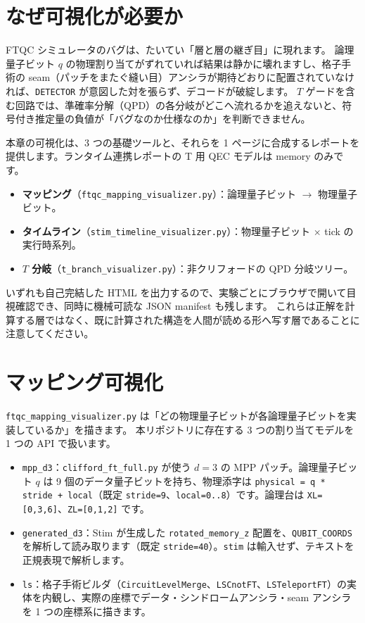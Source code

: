 \section{なぜ可視化が必要か}\label{sec:why_vis}

FTQC シミュレータのバグは、たいてい「層と層の継ぎ目」に現れます。
論理量子ビット $q$ の物理割り当てがずれていれば結果は静かに壊れますし、格子手術の seam（パッチをまたぐ縫い目）アンシラが期待どおりに配置されていなければ、\texttt{DETECTOR} が意図した対を張らず、デコードが破綻します。
$T$ ゲードを含む回路では、準確率分解（QPD）の各分岐がどこへ流れるかを追えないと、符号付き推定量の負値が「バグなのか仕様なのか」を判断できません。

本章の可視化は、3 つの基礎ツールと、それらを 1 ページに合成するレポートを提供します。ランタイム連携レポートの T 用 QEC モデルは memory のみです。

\begin{itemize}
  \item \textbf{マッピング}（\texttt{ftqc\_mapping\_visualizer.py}）：論理量子ビット $\to$ 物理量子ビット。
  \item \textbf{タイムライン}（\texttt{stim\_timeline\_visualizer.py}）：物理量子ビット $\times$ tick の実行時系列。
  \item \textbf{$T$ 分岐}（\texttt{t\_branch\_visualizer.py}）：非クリフォードの QPD 分岐ツリー。
\end{itemize}

いずれも自己完結した HTML を出力するので、実験ごとにブラウザで開いて目視確認でき、同時に機械可読な JSON manifest も残します。
これらは正解を計算する層ではなく、既に計算された構造を人間が読める形へ写す層であることに注意してください。

\section{マッピング可視化}\label{sec:mapping}

\texttt{ftqc\_mapping\_visualizer.py} は「どの物理量子ビットが各論理量子ビットを実装しているか」を描きます。
本リポジトリに存在する 3 つの割り当てモデルを 1 つの API で扱います。

\begin{itemize}
  \item \texttt{mpp\_d3}：\texttt{clifford\_ft\_full.py} が使う $d=3$ の MPP パッチ。論理量子ビット $q$ は 9 個のデータ量子ビットを持ち、物理添字は \texttt{physical = q * stride + local}（既定 \texttt{stride=9}、\texttt{local=0..8}）です。論理台は \texttt{XL=[0,3,6]}、\texttt{ZL=[0,1,2]} です。
  \item \texttt{generated\_d3}：Stim が生成した \texttt{rotated\_memory\_z} 配置を、\texttt{QUBIT\_COORDS} を解析して読み取ります（既定 \texttt{stride=40}）。\texttt{stim} は輸入せず、テキストを正規表現で解析します。
  \item \texttt{ls}：格子手術ビルダ（\texttt{CircuitLevelMerge}、\texttt{LSCnotFT}、\texttt{LSTeleportFT}）の実体を内観し、実際の座標でデータ・シンドロームアンシラ・seam アンシラを 1 つの座標系に描きます。
\end{itemize}

